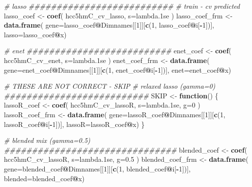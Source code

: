 \documentclass[
]{book}
\newenvironment{Shaded}{\begin{snugshade}}{\end{snugshade}}
\newcommand{\CommentTok}[1]{\textcolor[rgb]{0.56,0.35,0.01}{\textit{#1}}}
\newcommand{\ControlFlowTok}[1]{\textcolor[rgb]{0.13,0.29,0.53}{\textbf{#1}}}
\newcommand{\DataTypeTok}[1]{\textcolor[rgb]{0.13,0.29,0.53}{#1}}
\newcommand{\DecValTok}[1]{\textcolor[rgb]{0.00,0.00,0.81}{#1}}
\newcommand{\FloatTok}[1]{\textcolor[rgb]{0.00,0.00,0.81}{#1}}
\newcommand{\KeywordTok}[1]{\textcolor[rgb]{0.13,0.29,0.53}{\textbf{#1}}}
\newcommand{\NormalTok}[1]{#1}
\newcommand{\OperatorTok}[1]{\textcolor[rgb]{0.81,0.36,0.00}{\textbf{#1}}}
\newcommand{\StringTok}[1]{\textcolor[rgb]{0.31,0.60,0.02}{#1}}
\begin{document}
\begin{Shaded}
\begin{Highlighting}[]
\CommentTok{\# lasso }
\CommentTok{\#\#\#\#\#\#\#\#\#\#\#\#\#\#\#\#\#\#\#\#\#\#\#\#\#\#}
\CommentTok{\# train {-} cv predicted}
\NormalTok{lasso\_coef <{-}}\StringTok{ }\KeywordTok{coef}\NormalTok{(}
\NormalTok{ hcc5hmC\_cv\_lasso,}
 \DataTypeTok{s=}\StringTok{\textquotesingle{}lambda.1se\textquotesingle{}}
\NormalTok{)}
\NormalTok{lasso\_coef\_frm <{-}}\StringTok{ }\KeywordTok{data.frame}\NormalTok{(}
 \DataTypeTok{gene=}\NormalTok{lasso\_coef}\OperatorTok{@}\NormalTok{Dimnames[[}\DecValTok{1}\NormalTok{]][}\KeywordTok{c}\NormalTok{(}\DecValTok{1}\NormalTok{, lasso\_coef}\OperatorTok{@}\NormalTok{i[}\OperatorTok{{-}}\DecValTok{1}\NormalTok{])],}
 \DataTypeTok{lasso=}\NormalTok{lasso\_coef}\OperatorTok{@}\NormalTok{x)}


\CommentTok{\# enet}
\CommentTok{\#\#\#\#\#\#\#\#\#\#\#\#\#\#\#\#\#\#\#\#\#\#\#\#\#\#}
\NormalTok{enet\_coef <{-}}\StringTok{ }\KeywordTok{coef}\NormalTok{(}
\NormalTok{ hcc5hmC\_cv\_enet,}
 \DataTypeTok{s=}\StringTok{\textquotesingle{}lambda.1se\textquotesingle{}}
\NormalTok{)}
\NormalTok{enet\_coef\_frm <{-}}\StringTok{ }\KeywordTok{data.frame}\NormalTok{(}
 \DataTypeTok{gene=}\NormalTok{enet\_coef}\OperatorTok{@}\NormalTok{Dimnames[[}\DecValTok{1}\NormalTok{]][}\KeywordTok{c}\NormalTok{(}\DecValTok{1}\NormalTok{, enet\_coef}\OperatorTok{@}\NormalTok{i[}\OperatorTok{{-}}\DecValTok{1}\NormalTok{])],}
 \DataTypeTok{enet=}\NormalTok{enet\_coef}\OperatorTok{@}\NormalTok{x)}

\CommentTok{\# THESE ARE NOT CORRECT {-} SKIP}
\CommentTok{\# relaxed lasso (gamma=0)}
\CommentTok{\#\#\#\#\#\#\#\#\#\#\#\#\#\#\#\#\#\#\#\#\#\#\#\#\#\#}
\NormalTok{SKIP <{-}}\StringTok{ }\ControlFlowTok{function}\NormalTok{() \{}
\NormalTok{lassoR\_coef <{-}}\StringTok{ }\KeywordTok{coef}\NormalTok{(}
\NormalTok{ hcc5hmC\_cv\_lassoR,}
 \DataTypeTok{s=}\StringTok{\textquotesingle{}lambda.1se\textquotesingle{}}\NormalTok{,}
 \DataTypeTok{g=}\DecValTok{0}
\NormalTok{)}
\NormalTok{lassoR\_coef\_frm <{-}}\StringTok{ }\KeywordTok{data.frame}\NormalTok{(}
 \DataTypeTok{gene=}\NormalTok{lassoR\_coef}\OperatorTok{@}\NormalTok{Dimnames[[}\DecValTok{1}\NormalTok{]][}\KeywordTok{c}\NormalTok{(}\DecValTok{1}\NormalTok{, lassoR\_coef}\OperatorTok{@}\NormalTok{i[}\OperatorTok{{-}}\DecValTok{1}\NormalTok{])],}
 \DataTypeTok{lassoR=}\NormalTok{lassoR\_coef}\OperatorTok{@}\NormalTok{x)}
\NormalTok{\}}

\CommentTok{\# blended mix (gamma=0.5)}
\CommentTok{\#\#\#\#\#\#\#\#\#\#\#\#\#\#\#\#\#\#\#\#\#\#\#\#\#\#\#\#\#\#\#}
\NormalTok{blended\_coef <{-}}\StringTok{ }\KeywordTok{coef}\NormalTok{(}
\NormalTok{ hcc5hmC\_cv\_lassoR,}
 \DataTypeTok{s=}\StringTok{\textquotesingle{}lambda.1se\textquotesingle{}}\NormalTok{,}
 \DataTypeTok{g=}\FloatTok{0.5}
\NormalTok{)}
\NormalTok{blended\_coef\_frm <{-}}\StringTok{ }\KeywordTok{data.frame}\NormalTok{(}
 \DataTypeTok{gene=}\NormalTok{blended\_coef}\OperatorTok{@}\NormalTok{Dimnames[[}\DecValTok{1}\NormalTok{]][}\KeywordTok{c}\NormalTok{(}\DecValTok{1}\NormalTok{, blended\_coef}\OperatorTok{@}\NormalTok{i[}\OperatorTok{{-}}\DecValTok{1}\NormalTok{])],}
 \DataTypeTok{blended=}\NormalTok{blended\_coef}\OperatorTok{@}\NormalTok{x)}



\end{Highlighting}
\end{Shaded}
\end{document}
